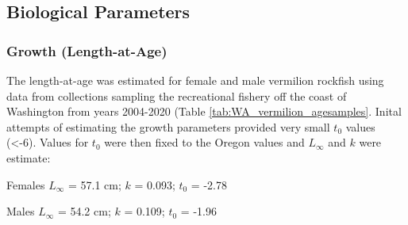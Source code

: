 \documentclass[11pt,
  english,
  a4paper,
]{article}
\begin{document}
\leavevmode\tagmcend\tagstructend\par


\hypertarget{biological-parameters}{%
\subsection{Biological Parameters}\label{biological-parameters}}

\leavevmode\tagmcend\tagstructend


\hypertarget{growth-length-at-age}{%
\subsubsection{Growth (Length-at-Age)}\label{growth-length-at-age}}

\leavevmode\tagmcend\tagstructend


The length-at-age was estimated for female and male vermilion rockfish using data from collections sampling the recreational fishery off the coast of Washington from years 2004-2020 (Table \ref{tab:WA_vermilion_agesamples}. Inital attempts of estimating the growth parameters provided very small {\(t_0\)\leavevmode\tagmcend\tagstructend} values (\textless-6). Values for {\(t_0\)\leavevmode\tagmcend\tagstructend} were then fixed to the Oregon values and {\(L_{\infty}\)\leavevmode\tagmcend\tagstructend} and {\(k\)\leavevmode\tagmcend\tagstructend} were estimate:

\leavevmode\tagmcend\tagstructend\par

\begin{centering}

Females $L_{\infty}$ = 57.1 cm; $k$ = 0.093; $t_0$ = -2.78

Males $L_{\infty}$ = 54.2 cm; $k$ = 0.109; $t_0$ = -1.96

\end{centering}

\vspace{0.5cm}

\end{document}
